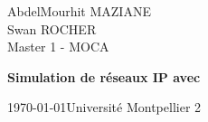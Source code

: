 
\setlength{\parskip}{5mm plus2mm minus2mm}
\lstset{language=tcl, showstringspaces=false, numbers=left, numberstyle=\tiny, tabsize=4}
 
{\setlength{\parindent}{0cm}
AbdelMourhit MAZIANE \\
Swan ROCHER \\
Master 1 - MOCA
}
\vfill
{\centering \Huge \bfseries Simulation de r\'eseaux IP avec \ns \par}
\vfill
\today \hfill Universit\'e Montpellier 2
\newpage
\tableofcontents
\thispagestyle{empty}
\newpage

